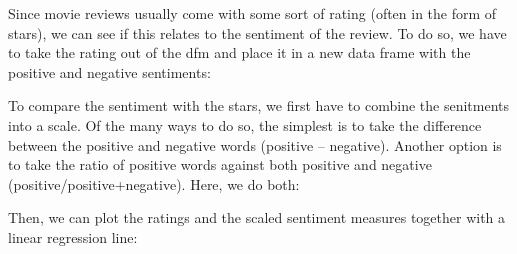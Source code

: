 \documentclass[
]{book}
\newenvironment{Shaded}{\begin{snugshade}}{\end{snugshade}}
\newcommand{\FunctionTok}[1]{\textcolor[rgb]{0.13,0.29,0.53}{\textbf{#1}}}
\newcommand{\NormalTok}[1]{#1}
\newcommand{\OtherTok}[1]{\textcolor[rgb]{0.56,0.35,0.01}{#1}}
\newcommand{\SpecialCharTok}[1]{\textcolor[rgb]{0.81,0.36,0.00}{\textbf{#1}}}
\newcommand{\StringTok}[1]{\textcolor[rgb]{0.31,0.60,0.02}{#1}}
\begin{document}
Since movie reviews usually come with some sort of rating (often in the form of stars), we can see if this relates to the sentiment of the review. To do so, we have to take the rating out of the dfm and place it in a new data frame with the positive and negative sentiments:

\begin{Shaded}
\end{Shaded}

To compare the sentiment with the stars, we first have to combine the senitments into a scale. Of the many ways to do so, the simplest is to take the difference between the positive and negative words (positive -- negative). Another option is to take the ratio of positive words against both positive and negative (positive/positive+negative). Here, we do both:

\begin{Shaded}
\end{Shaded}

Then, we can plot the ratings and the scaled sentiment measures together with a linear regression line:
\end{document}
